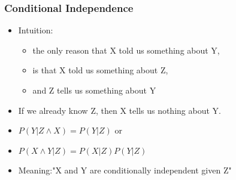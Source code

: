 \documentclass[xcolor=dvipsnames,ignorenonframetext]{beamer}
\begin{document}
\begin{frame}
  \frametitle{Conditional Independence}
  \begin{itemize}
  \item Intuition:
    \begin{itemize}
    \item the only reason that X told us something about Y,
    \item is that X told us something about Z,
    \item and Z tells us something about Y
    \end{itemize}
  \item If we already know Z, then X tells us nothing about Y.
  \item $P(Y | Z\wedge X) = P(Y | Z)$ or
  \item $P(X\wedge Y | Z) = P(X | Z)P(Y | Z)$
  \item Meaning:\newline  "X and Y are conditionally independent given Z"
  \end{itemize}
\end{frame}
\end{document}
